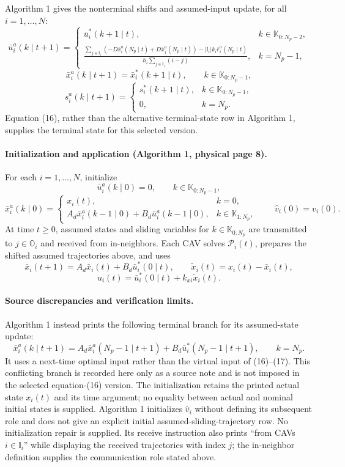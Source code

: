 \documentclass{article}
\begin{document}
Algorithm 1 gives the nonterminal shifts and assumed-input update, for all $i=1,\ldots,N$:
\[
\bar u_i^a(k\mid t+1)=
\begin{cases}
\bar u_i^*(k+1\mid t),&k\in\mathbb K_{0:N_p-2},\\[3pt]
\displaystyle
\frac{\sum_{j\in\mathbb I_i}\left(-D\bar x_i^a(N_p\mid t)+D\bar x_j^a(N_p\mid t)\right)
-|\mathbb I_i|k_i\bar e_i^a(N_p\mid t)}
{h_i\sum_{j\in\mathbb I_i}(i-j)},&k=N_p-1,
\end{cases}
\]
\[
\bar x_i^a(k\mid t+1)=\bar x_i^*(k+1\mid t),
\qquad k\in\mathbb K_{0:N_p-1},
\]
\[
s_i^a(k\mid t+1)=
\begin{cases}
s_i^*(k+1\mid t),&k\in\mathbb K_{0:N_p-1},\\
0,&k=N_p.
\end{cases}
\]
Equation (16), rather than the alternative terminal-state row in Algorithm 1, supplies the terminal state for this selected version.

\paragraph{Initialization and application (Algorithm 1, physical page 8).}
For each $i=1,\ldots,N$, initialize
\[
\bar u_i^a(k\mid0)=0,\qquad k\in\mathbb K_{0:N_p-1},
\]
\[
\bar x_i^a(k\mid0)=
\begin{cases}
x_i(t),&k=0,\\
A_d\bar x_i^a(k-1\mid0)+B_d\bar u_i^a(k-1\mid0),
&k\in\mathbb K_{1:N_p},
\end{cases}
\qquad
\widehat v_i(0)=v_i(0).
\]
At time $t\geq0$, assumed states and sliding variables for $k\in\mathbb K_{0:N_p}$ are transmitted to $j\in\mathbb O_i$ and received from in-neighbors. Each CAV solves $\mathscr P_i(t)$, prepares the shifted assumed trajectories above, and uses
\[
\bar x_i(t+1)=A_d\bar x_i(t)+B_d\bar u_i^*(0\mid t),
\qquad
\widetilde x_i(t)=x_i(t)-\bar x_i(t),
\]
\[
u_i(t)=\bar u_i^*(0\mid t)+k_{xi}\widetilde x_i(t).
\]

\paragraph{Source discrepancies and verification limits.}
Algorithm 1 instead prints the following terminal branch for its assumed-state update:
\[
\bar x_i^a(k\mid t+1)
=A_d\bar x_i^a(N_p-1\mid t+1)
 +B_d\bar u_i^*(N_p-1\mid t+1),\qquad k=N_p.
\]
It uses a next-time optimal input rather than the virtual input of (16)--(17). This conflicting branch is recorded here only as a source note and is not imposed in the selected equation-(16) version. The initialization retains the printed actual state $x_i(t)$ and its time argument; no equality between actual and nominal initial states is supplied. Algorithm 1 initializes $\widehat v_i$ without defining its subsequent role and does not give an explicit initial assumed-sliding-trajectory row. No initialization repair is supplied. Its receive instruction also prints ``from CAVs $i\in\mathbb I_i$'' while displaying the received trajectories with index $j$; the in-neighbor definition supplies the communication role stated above.
\end{document}
